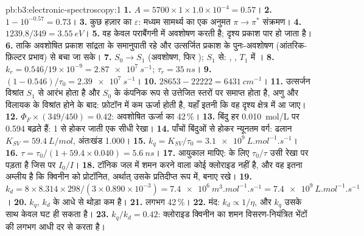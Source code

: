\begin{solution}{pb:b3:electronic-spectroscopy:1}
\textbf{1.} $A = 5700 \times 1 \times 1.0\times10^{-4} = 0.57$।
\textbf{2.} $1 - 10^{-0.57} = 0.73$।
\textbf{3.} कुछ हज़ार का $\varepsilon$: मध्यम सामर्थ्य का एक अनुमत $\pi\to\pi^*$
संक्रमण।
\textbf{4.} $1239.8/349 = \qty{3.55}{eV}$।
\textbf{5.} वह केवल पराबैंगनी में अवशोषण करती है; दृश्य प्रकाश पार हो जाता है।
\textbf{6.} ताकि अवशोषित प्रकाश सांद्रता के समानुपाती रहे और उत्सर्जित प्रकाश के
पुनः-अवशोषण (आंतरिक-फ़िल्टर प्रभाव) से बचा जा सके।
\textbf{7.} $S_0 \to S_1$ (अवशोषण, फिर ); $S_1$ से:
, , $T_1$ में ।
\textbf{8.} $k_r = 0.546/19 \times 10^{-9} = \qty{2.87e7}{s^{-1}}$; $\tau_r = \qty{35}{ns}$।
\textbf{9.} $(1 - 0.546)/\tau_0 = \qty{2.39e7}{s^{-1}}$।
\textbf{10.} $28653 - 22222 = \qty{6431}{cm^{-1}}$।
\textbf{11.} उत्सर्जन विश्रांत $S_1$ से आरंभ होता है और $S_0$ के कंपनिक रूप से उत्तेजित
स्तरों पर समाप्त होता है, अणु और विलायक के विश्रांत होने के बाद: फ़ोटॉन में कम
ऊर्जा होती है, यहाँ इतनी कि वह दृश्य क्षेत्र में आ जाए।
\textbf{12.} $\Phi_F \times (349/450) = 0.42$: अवशोषित ऊर्जा का 42\,\%।
\textbf{13.} बिंदु हर \qty{0.010}{mol/L} पर 0.594 बढ़ते हैं: 1 से होकर जाती एक सीधी रेखा।
\textbf{14.} पाँचों बिंदुओं से होकर न्यूनतम वर्ग: ढलान $K_{SV} = \qty{59.4}{L/mol}$,
अंतःखंड 1.000।
\textbf{15.} $k_q = K_{SV}/\tau_0 = \qty{3.1e9}{L.mol^{-1}.s^{-1}}$।
\textbf{16.} $\tau = \tau_0/(1 + 59.4 \times 0.040) = \qty{5.6}{ns}$।
\textbf{17.} आयुकाल मापिए:  के लिए $\tau_0/\tau$ उसी रेखा पर पड़ता है
जिस पर $I_0/I$।
\textbf{18.} टॉनिक जल में शमन करने वाला कोई क्लोराइड नहीं है, और वह इतना अम्लीय है कि
क्विनीन को प्रोटॉनित, अर्थात् उसके प्रतिदीप्त रूप में, बनाए रखे।
\textbf{19.} $k_d = 8 \times 8.314 \times 298/(3 \times 0.890\times10^{-3}) =
\qty{7.4e6}{m^3.mol^{-1}.s^{-1}} = \qty{7.4e9}{L.mol^{-1}.s^{-1}}$।
\textbf{20.} $k_q$, $k_d$ के आधे से थोड़ा कम है।
\textbf{21.} लगभग 42\,\%।
\textbf{22.} मंद: $k_d \propto 1/\eta$, और $k_q$ उसके साथ केवल घट ही सकता है।
\textbf{23.} \textbf{$k_q/k_d = 0.42$}: क्लोराइड क्विनीन का शमन विसरण-नियंत्रित
भेंटों की लगभग आधी दर से करता है।
\end{solution}

